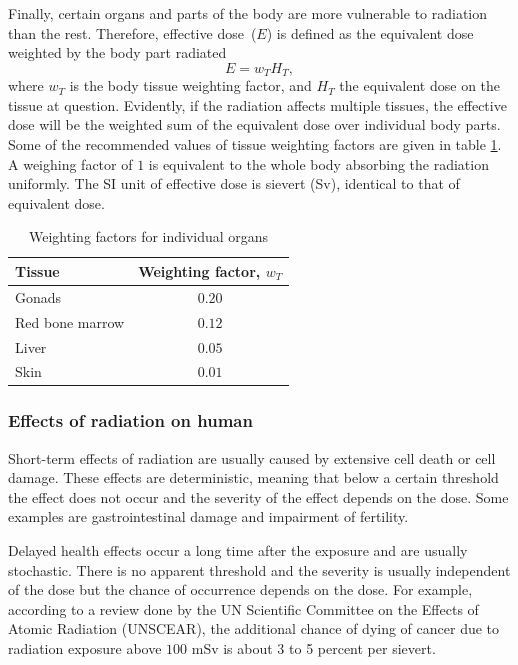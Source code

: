 \documentclass[nofootinbib,preprint,aip,pra]{revtex4-1}
\begin{document}
        Finally, certain organs and parts of the body are more vulnerable to radiation than the rest.
        Therefore, effective dose~($E$) is defined as the equivalent dose weighted by the body part
        radiated
        \begin{equation}
            E = w_T H_T,
        \end{equation}
        where $w_T$ is the body tissue weighting factor, and $H_T$ the equivalent dose on the tissue
        at question.
        Evidently, if the radiation affects multiple tissues, the effective dose will be the weighted
        sum of the equivalent dose over individual body parts. Some of the recommended values of tissue
        weighting factors are given in table \ref{tab:eff}. A weighing factor of $1$ is equivalent to the
        whole body absorbing the radiation uniformly. The SI unit of effective dose is sievert (Sv),
        identical to that of equivalent dose.
        \begin{table}
            \label{tab:eff}
            \centering
            \caption{Weighting factors for individual organs\cite{icrp74}}
            \begin{ruledtabular}
                \begin{tabular}{l c}
                Tissue & Weighting factor, $w_T$\\
                \hline
                Gonads & $0.20$\\
                Red bone marrow & $0.12$ \\
                Liver & $0.05$ \\
                Skin & $0.01$ \\
                \end{tabular}
            \end{ruledtabular}
        \end{table}
        \subsubsection{Effects of radiation on human}
        Short-term effects of radiation are usually caused by extensive cell death or cell damage.\cite{u16}
        These effects are deterministic, meaning that below a certain threshold the effect does not occur and
        the severity of the effect depends on the dose. Some examples are gastrointestinal damage and impairment
        of fertility.\cite{u16, l01}

        Delayed health effects occur a long time after the exposure and are usually stochastic. There is
        no apparent threshold and the severity is usually independent of the dose but
        the chance of occurrence depends on the dose.\cite{u16,l01}
        For example, according to a review done by the UN Scientific Committee on the Effects of Atomic Radiation
        (UNSCEAR), the additional chance of dying of cancer due to radiation exposure above $100$ mSv is
        about 3 to 5 percent per sievert.\cite{unscear12}
\end{document}
